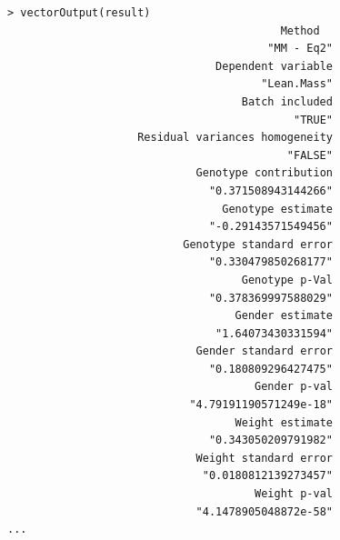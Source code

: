 \documentclass[12pt,a4paper]{article}
\begin{document}
\begingroup
    \fontsize{8pt}{12pt}\selectfont
\begin{verbatim}
> vectorOutput(result)
                                          Method 
                                        "MM - Eq2" 
                                Dependent variable 
                                       "Lean.Mass" 
                                    Batch included 
                                            "TRUE" 
                    Residual variances homogeneity 
                                           "FALSE" 
                             Genotype contribution 
                               "0.371508943144266" 
                                 Genotype estimate 
                               "-0.29143571549456" 
                           Genotype standard error 
                               "0.330479850268177" 
                                    Genotype p-Val 
                               "0.378369997588029" 
                                   Gender estimate 
                                "1.64073430331594" 
                             Gender standard error 
                               "0.180809296427475" 
                                      Gender p-val 
                            "4.79191190571249e-18" 
                                   Weight estimate 
                               "0.343050209791982" 
                             Weight standard error 
                              "0.0180812139273457" 
                                      Weight p-val 
                             "4.1478905048872e-58" 
...
\end{verbatim}
\endgroup
\end{document}
